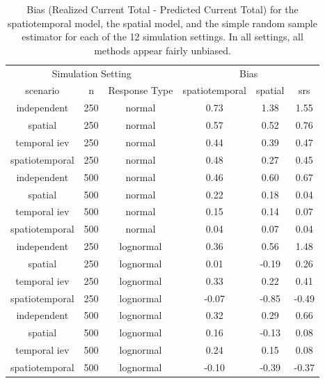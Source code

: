 \documentclass[]{interact}
\theoremstyle{plain}%
\theoremstyle{definition}
\theoremstyle{remark}
\begin{document}
\begin{table}[H]

\caption{\label{tab:simbiastab}Bias (Realized Current Total - Predicted Current Total) for the spatiotemporal model, the spatial model, and the simple random sample estimator for each of the 12 simulation settings. In all settings, all methods appear fairly unbiased.}
\centering
\begin{tabular}[t]{cccccc}
\toprule
\multicolumn{3}{c}{Simulation Setting} & \multicolumn{3}{c}{Bias} \\
\cmidrule(l{3pt}r{3pt}){1-3} \cmidrule(l{3pt}r{3pt}){4-6}
scenario & n & Response Type & spatiotemporal & spatial & srs\\
\midrule
independent & 250 & normal & 0.73 & 1.38 & 1.55\\
spatial & 250 & normal & 0.57 & 0.52 & 0.76\\
temporal iev & 250 & normal & 0.44 & 0.39 & 0.47\\
spatiotemporal & 250 & normal & 0.48 & 0.27 & 0.45\\
\midrule
independent & 500 & normal & 0.46 & 0.60 & 0.67\\
spatial & 500 & normal & 0.22 & 0.18 & 0.04\\
temporal iev & 500 & normal & 0.15 & 0.14 & 0.07\\
spatiotemporal & 500 & normal & 0.04 & 0.07 & 0.04\\
\midrule
independent & 250 & lognormal & 0.36 & 0.56 & 1.48\\
spatial & 250 & lognormal & 0.01 & -0.19 & 0.26\\
temporal iev & 250 & lognormal & 0.33 & 0.22 & 0.41\\
spatiotemporal & 250 & lognormal & -0.07 & -0.85 & -0.49\\
\midrule
independent & 500 & lognormal & 0.32 & 0.29 & 0.66\\
spatial & 500 & lognormal & 0.16 & -0.13 & 0.08\\
temporal iev & 500 & lognormal & 0.24 & 0.15 & 0.08\\
spatiotemporal & 500 & lognormal & -0.10 & -0.39 & -0.37\\
\bottomrule
\end{tabular}
\end{table}
\end{document}
